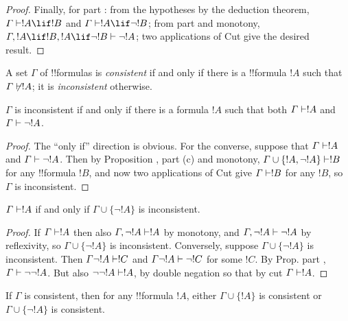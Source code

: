 \documentclass[../../include/open-logic-section]{subfiles}
\begin{document}
\begin{proof}
\smallskip\noindent
Finally, for part : from the hypotheses by the
deduction theorem, $\Gamma \Proves !A \lif !B$ and $\Gamma
\Proves !A \lif \lnot !B$; from part 
and monotony, $\Gamma, !A \lif !B, !A \lif \lnot !B
  \Proves \lnot !A$; two applications of Cut give the desired result. 
\end{proof}

\begin{defn}[Consistency]
  A set $\Gamma$ of !!{formula}s is \emph{consistent} if and only if there
  is a !!{formula} $!A$ such that $\Gamma\Proves/!A$; it is
  \emph{inconsistent} otherwise.
\end{defn}

\begin{prop}
  $\Gamma$ is inconsistent if and only if there is a formula $!A$
  such that both $\Gamma \Proves !A$ and $\Gamma\Proves\lnot !A$.
\end{prop}

\begin{proof}
  The ``only if'' direction is obvious. For the converse, suppose that
  $\Gamma \Proves !A$ and $\Gamma\Proves\lnot !A$. Then by
  Proposition , part (c) and monotony, $\Gamma
  \cup \{!A,\lnot!A \} \Proves !B$ for any !!{formula} $!B$,
  and now two applications of Cut give $\Gamma\Proves!B$ for any
  $!B$, so $\Gamma$ is inconsistent.
\end{proof}

\begin{prop}
  $\Gamma \Proves!A$ if and only if $\Gamma\cup \{\lnot!A \}$
  is inconsistent.
\end{prop}

\begin{proof}
  If $\Gamma \Proves !A$ then also $\Gamma, \lnot !A \Proves
  !A$ by monotony, and $\Gamma, \lnot !A \Proves
  \lnot !A$ by reflexivity, so $\Gamma\cup\{\lnot !A\}$ is
  inconsistent.  Conversely, suppose $\Gamma\cup\{\lnot !A\}$ is
  inconsistent. Then $\Gamma \lnot !A \Proves !C$ and $\Gamma
  \lnot !A \Proves \lnot !C$ for some $!C$. By
  Prop.  part ,
  $\Gamma \Proves \lnot \lnot !A$. But also $\lnot\lnot!A
  \Proves !A$, by double negation so that by cut $\Gamma \Proves
  !A$. 
\end{proof}

\begin{prop}
  If $\Gamma$ is consistent, then for any !!{formula} $!A$, either
  $\Gamma \cup\{!A\}$ is consistent or $\Gamma \cup\{\lnot
  !A\}$ is consistent.
\end{prop}
\end{document}
